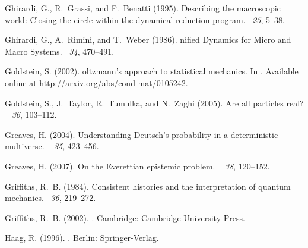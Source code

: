 \documentclass[12pt]{article}
\begin{document}
\begin{thebibliography}{}
Ghirardi, G., R.~Grassi, and F.~Benatti (1995).
\newblock Describing the macroscopic world: Closing the circle within the
  dynamical reduction program.
~{\em 25}, 5--38.

Ghirardi, G., A.~Rimini, and T.~Weber (1986).
nified {D}ynamics for {M}icro and {M}acro {S}ystems.
~{\em 34}, 470--491.

Goldstein, S. (2002).
oltzmann's approach to statistical mechanics.
\newblock In .
\newblock Available online at http://arxiv.org/abs/cond-mat/0105242.

Goldstein, S., J.~Taylor, R.~Tumulka, and N.~Zaghi (2005).
\newblock Are all particles real?
~{\em
  36}, 103--112.

Greaves, H. (2004).
\newblock Understanding {D}eutsch's probability in a deterministic multiverse.
~{\em
  35}, 423--456.

Greaves, H. (2007).
\newblock On the {E}verettian epistemic problem.
~{\em
  38}, 120--152.

Griffiths, R.~B. (1984).
\newblock Consistent histories and the interpretation of quantum mechanics.
~{\em 36}, 219--272.

Griffiths, R.~B. (2002).
.
\newblock Cambridge: Cambridge University Press.

Haag, R. (1996).
.
\newblock Berlin: Springer-Verlag.


\end{thebibliography}
\end{document}
